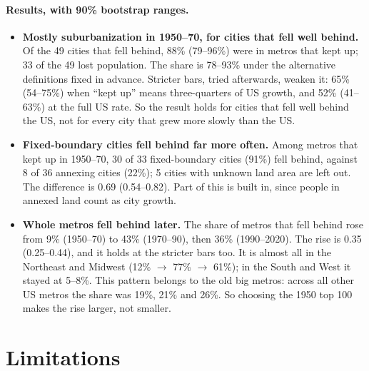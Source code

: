 \documentclass[11pt]{article}
\begin{document}
\paragraph{Results, with 90\% bootstrap ranges.}
\begin{itemize}
  \item \textbf{Mostly suburbanization in 1950--70, for cities that fell well behind.} Of the 49
        cities that fell behind, 88\% (79--96\%) were in metros that kept up; 33 of the 49 lost
        population. The share is 78--93\% under the alternative definitions fixed in advance. Stricter
        bars, tried afterwards, weaken it: 65\% (54--75\%) when ``kept up'' means three-quarters of US
        growth, and 52\% (41--63\%) at the full US rate. So the result holds for cities that fell
        well behind the US, not for every city that grew more slowly than the US.
  \item \textbf{Fixed-boundary cities fell behind far more often.} Among metros that kept up in
        1950--70, 30 of 33 fixed-boundary cities (91\%) fell behind, against 8 of 36 annexing cities
        (22\%); 5 cities with unknown land area are left out. The difference is 0.69 (0.54--0.82).
        Part of this is built in, since people in annexed land count as city growth.
  \item \textbf{Whole metros fell behind later.} The share of metros that fell behind rose from 9\%
        (1950--70) to 43\% (1970--90), then 36\% (1990--2020). The rise is 0.35 (0.25--0.44), and it
        holds at the stricter bars too. It is almost all in the Northeast and Midwest
        (12\% $\to$ 77\% $\to$ 61\%); in the South and West it stayed at 5--8\%. This pattern belongs
        to the old big metros: across all other US metros the share was 19\%, 21\% and 26\%. So
        choosing the 1950 top 100 makes the rise larger, not smaller.
\end{itemize}

\section{Limitations}
\end{document}
